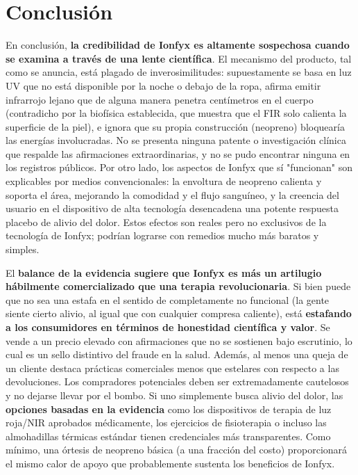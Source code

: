 \documentclass{article}
\begin{document}
\section{Conclusión}

En conclusión, \textbf{la credibilidad de Ionfyx es altamente sospechosa cuando se examina a través de una lente científica}. El mecanismo del producto, tal como se anuncia, está plagado de inverosimilitudes: supuestamente se basa en luz UV que no está disponible por la noche o debajo de la ropa, afirma emitir infrarrojo lejano que de alguna manera penetra centímetros en el cuerpo (contradicho por la biofísica establecida, que muestra que el FIR solo calienta la superficie de la piel), e ignora que su propia construcción (neopreno) bloquearía las energías involucradas. No se presenta ninguna patente o investigación clínica que respalde las afirmaciones extraordinarias, y no se pudo encontrar ninguna en los registros públicos. Por otro lado, los aspectos de Ionfyx que sí "funcionan" son explicables por medios convencionales: la envoltura de neopreno calienta y soporta el área, mejorando la comodidad y el flujo sanguíneo, y la creencia del usuario en el dispositivo de alta tecnología desencadena una potente respuesta placebo de alivio del dolor. Estos efectos son reales pero no exclusivos de la tecnología de Ionfyx; podrían lograrse con remedios mucho más baratos y simples.

El \textbf{balance de la evidencia sugiere que Ionfyx es más un artilugio hábilmente comercializado que una terapia revolucionaria}. Si bien puede que no sea una estafa en el sentido de completamente no funcional (la gente siente cierto alivio, al igual que con cualquier compresa caliente), está \textbf{estafando a los consumidores en términos de honestidad científica y valor}. Se vende a un precio elevado con afirmaciones que no se sostienen bajo escrutinio, lo cual es un sello distintivo del fraude en la salud. Además, al menos una queja de un cliente destaca prácticas comerciales menos que estelares con respecto a las devoluciones. Los compradores potenciales deben ser extremadamente cautelosos y no dejarse llevar por el bombo. Si uno simplemente busca alivio del dolor, las \textbf{opciones basadas en la evidencia} como los dispositivos de terapia de luz roja/NIR aprobados médicamente, los ejercicios de fisioterapia o incluso las almohadillas térmicas estándar tienen credenciales más transparentes. Como mínimo, una órtesis de neopreno básica (a una fracción del costo) proporcionará el mismo calor de apoyo que probablemente sustenta los beneficios de Ionfyx.
\end{document}
